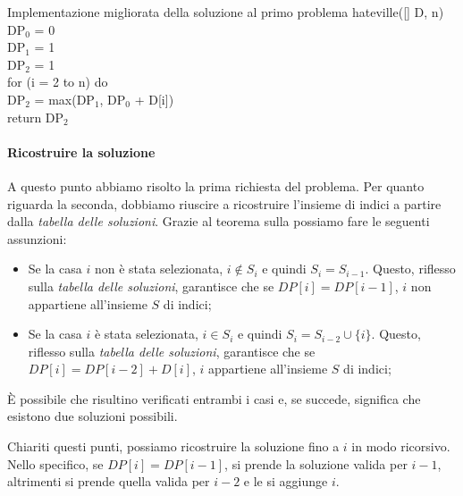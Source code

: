 \begin{minicode}{Implementazione migliorata della soluzione al primo problema}
\ind{} hateville([] D,  n)\\
     DP$_0$ = 0\\
     DP$_1$ = 1\\
     DP$_2$ = 1\\
    \indf for (i = 2 to n) do\\
        DP$_2$ = max(DP$_1$, DP$_0$ + D[i])\\
    \indf return DP$_2$
\end{minicode}

\paragraph{Ricostruire la soluzione}
A questo punto abbiamo risolto la prima richiesta del problema. Per quanto
riguarda la seconda, dobbiamo riuscire a ricostruire l'insieme di indici a
partire dalla \emph{tabella delle soluzioni}. Grazie al teorema sulla
\emph{} possiamo fare le seguenti assunzioni:
\begin{itemize}
    \item Se la casa $i$ non è stata selezionata, $i\notin S_i$ e quindi $S_i=S_
    {i-1}$. Questo, riflesso sulla \emph{tabella delle soluzioni}, garantisce che
    se $DP[i]=DP[i-1]$, $i$ non appartiene all'insieme $S$ di indici;
    \item Se la casa $i$ è stata selezionata, $i\in S_i$ e quindi $S_i=S_{i-2}
    \cup\{i\}$. Questo, riflesso sulla \emph{tabella delle soluzioni}, garantisce
    che se $DP[i]=DP[i-2]+D[i]$, $i$ appartiene all'insieme $S$ di indici;
\end{itemize}
\begin{note}
    È possibile che risultino verificati entrambi i casi e, se succede, significa
    che esistono due soluzioni possibili.
\end{note}\noindent
Chiariti questi punti, possiamo ricostruire la soluzione fino a $i$ in modo
ricorsivo. Nello specifico, se $DP[i]=DP[i-1]$, si prende la soluzione valida per
$i-1$, altrimenti si prende quella valida per $i-2$ e le si aggiunge $i$.

